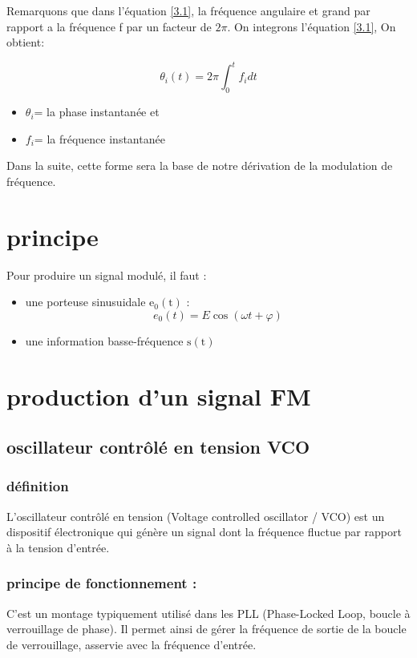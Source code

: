 \documentclass[12pt,a4paper,hidelinks,oneside]{book}
\begin{document}
Remarquons que dans l'équation \ref{3.1}, la fréquence angulaire et grand par rapport a la fréquence f par un facteur de $2\pi$. On integrons l'équation \ref{3.1}, On obtient:

\begin{equation}
\theta_{i}(t)=2 \pi \int_{0}^{t} f_{i} d t \label{3.2}
\end{equation}

\begin{itemize}
	\item $\theta_{i}$= la phase instantanée et
	\item $f_{i}$= la fréquence instantanée
\end{itemize}

Dans la suite, cette forme sera la base de notre dérivation de la modulation de fréquence.
\section{principe}
Pour produire un signal modulé, il faut :
\begin{itemize}
	\item une porteuse sinusuidale $\mathrm{e_0}(\mathrm{t})$ :
	\begin{equation}
	e_{0}(t)=E \cos (\omega t+\varphi) 
	\end{equation}
	\item une information basse-fréquence $\mathrm{s}(\mathrm{t})$
\end{itemize}

\section{production d'un signal FM}
\subsection{oscillateur contrôlé en tension VCO}
\subsubsection{définition}
L'oscillateur contrôlé en tension (Voltage controlled oscillator / VCO) est un dispositif électronique qui génère un signal dont la fréquence fluctue par rapport à la tension d'entrée.
\subsubsection{principe de fonctionnement :}
C'est un montage typiquement utilisé dans les PLL (Phase-Locked Loop, boucle à verrouillage de phase). Il permet ainsi de gérer la fréquence de sortie de la boucle de verrouillage, asservie avec la fréquence d'entrée.
\end{document}
